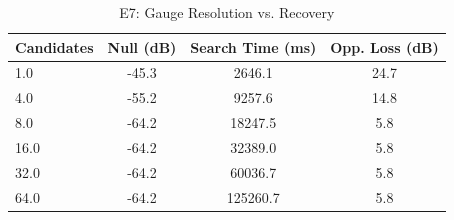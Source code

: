 \begin{table}[h]
\centering
\caption{E7: Gauge Resolution vs. Recovery}
\begin{tabular}{lccc}
\toprule
Candidates & Null (dB) & Search Time (ms) & Opp. Loss (dB) \\
\midrule
1.0 & -45.3 & 2646.1 & 24.7 \\
4.0 & -55.2 & 9257.6 & 14.8 \\
8.0 & -64.2 & 18247.5 & 5.8 \\
16.0 & -64.2 & 32389.0 & 5.8 \\
32.0 & -64.2 & 60036.7 & 5.8 \\
64.0 & -64.2 & 125260.7 & 5.8 \\
\bottomrule
\end{tabular}
\end{table}
